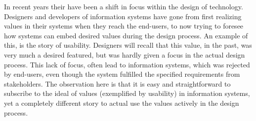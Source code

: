 In recent years their have been a shift in focus within the design of technology. Designers and developers of information systems have gone from first realizing values in their systems when they reach the end-users, to now trying to foresee how systems can embed desired values during the design process.\newline 
An example of this, is the story of usability. Designers will recall that this value, in the past, was very much a desired featured, but was hardly given a focus in the actual design process. This lack of focus, often lead to information systems, which was rejected by end-users, even though the system fulfilled the specified requirements from stakeholders.\newline
The observation here is that it is easy and straightforward to subscribe to the ideal of values (exemplified by usability) in information systems, yet a completely different story to actual use the values actively in the design process.





